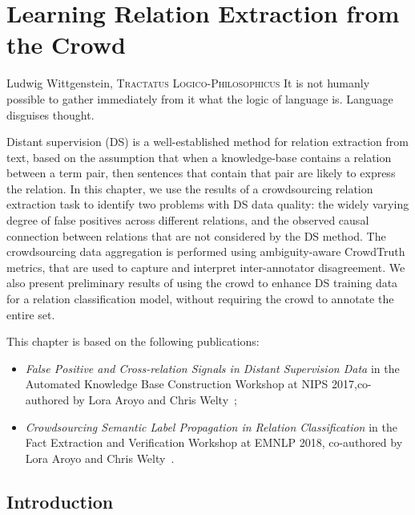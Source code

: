 \chapter{Learning Relation Extraction from the Crowd}
\label{chap:od-rel-ex}

\begin{chapquote}{Ludwig Wittgenstein, \textsc{Tractatus Logico-Philosophicus}}
It is not humanly possible to gather immediately from it what the logic of language is. Language disguises thought.
\end{chapquote}

Distant supervision (DS) is a well-established method for relation extraction from text, based on the assumption that when a knowledge-base contains a relation between a term pair, then sentences that contain that pair are likely to express the relation. In this chapter, we use the results of a crowdsourcing relation extraction task to identify two problems with DS data quality: the widely varying degree of false positives across different relations, and the observed causal connection between relations that are not considered by the DS method. The crowdsourcing data aggregation is performed using ambiguity-aware CrowdTruth metrics, that are used to capture and interpret inter-annotator disagreement. We also present preliminary results of using the crowd to enhance DS training data for a relation classification model, without requiring the crowd to annotate the entire set. 

This chapter is based on the following publications:

\begin{itemize}

\item \textit{False Positive and Cross-relation Signals in Distant Supervision Data} in the Automated 
Knowledge Base Construction Workshop at NIPS 2017,co-authored by Lora Aroyo and Chris Welty~\cite{dumitrache2017false};

\item \textit{Crowdsourcing Semantic Label Propagation in Relation Classification} in the Fact Extraction and Verification Workshop at EMNLP 2018, co-authored by Lora Aroyo and Chris Welty~\cite{dumitrache2018crowdsourcing}.

\end{itemize}

\section{Introduction}


